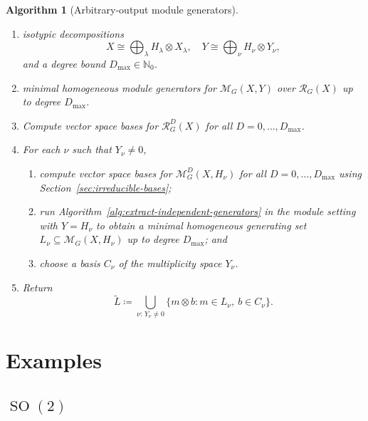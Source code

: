 \documentclass[11pt]{article}
\newcommand{\dsN}{\mathbb{N}}
\newcommand{\scM}{\mathcal{M}}
\newcommand{\scR}{\mathcal{R}}
\newcommand{\SO}{\operatorname{SO}}
\newtheorem{algorithm}[theorem]{Algorithm}
\theoremstyle{definition}
\begin{document}
\begin{algorithm}[Arbitrary-output module generators]\label{alg:arbitrary-output-module-generators}

  \phantom{}
  \begin{enumerate}[label=\textbf{Step \arabic*.},leftmargin=2.8cm]

    \item[\textbf{Input:}] isotypic decompositions
    \[
      X\cong \bigoplus_\lambda H_\lambda\otimes X_\lambda,
      \quad
      Y\cong \bigoplus_\nu H_\nu\otimes Y_\nu,
    \]
    and a degree bound $D_{\max}\in\dsN_0$.

    \item[\textbf{Output:}] minimal homogeneous module generators for $\scM_G(X,Y)$ over $\scR_G(X)$ up to degree $D_{\max}$.

    \item Compute vector space bases for $\scR_G^D(X)$ for all $D=0,\dots,D_{\max}$.

    \item For each $\nu$ such that $Y_\nu\neq 0$,
    \begin{enumerate}[leftmargin=2.2em]
      \item compute vector space bases for $\scM_G^D(X,H_\nu)$ for all $D=0,\dots,D_{\max}$ using Section~\ref{sec:irreducible-bases};
      \item run Algorithm~\ref{alg:extract-independent-generators} in the module setting with $Y=H_\nu$ to obtain a minimal homogeneous generating set $L_\nu\subseteq \scM_G(X,H_\nu)$ up to degree $D_{\max}$; and
      \item choose a basis $C_\nu$ of the multiplicity space $Y_\nu$.
    \end{enumerate}

    \item Return
    \[
      \widetilde L\coloneq \bigcup_{\nu:\,Y_\nu\neq 0}\{m\otimes b : m\in L_\nu,\ b\in C_\nu\}.
    \]
  \end{enumerate}
\end{algorithm}



\section{Examples}\label{sec:examples}

\subsection{\texorpdfstring{$\SO(2)$}{SO(2)}}\label{sec:examples-so2}
\end{document}
